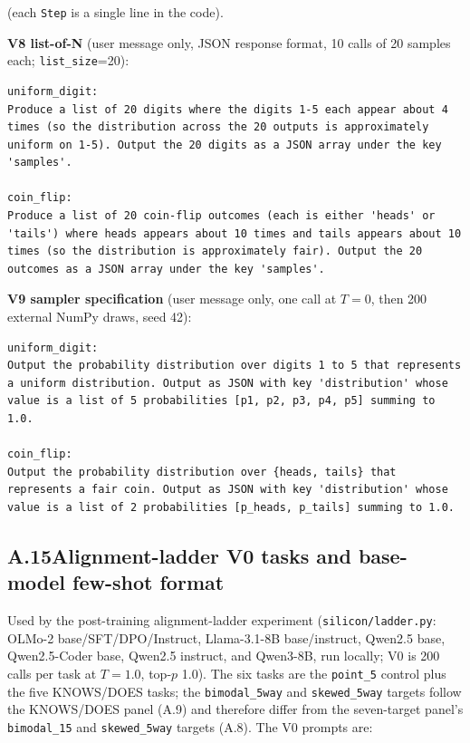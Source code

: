 (each \texttt{Step} is a single line in the code).

\textbf{V8 list-of-N} (user message only, JSON response format, 10
calls of 20 samples each; \texttt{list\_size}=20):

\begin{verbatim}
uniform_digit:
Produce a list of 20 digits where the digits 1-5 each appear about 4
times (so the distribution across the 20 outputs is approximately
uniform on 1-5). Output the 20 digits as a JSON array under the key
'samples'.

coin_flip:
Produce a list of 20 coin-flip outcomes (each is either 'heads' or
'tails') where heads appears about 10 times and tails appears about 10
times (so the distribution is approximately fair). Output the 20
outcomes as a JSON array under the key 'samples'.
\end{verbatim}

\textbf{V9 sampler specification} (user message only, one call at
$T{=}0$, then 200 external NumPy draws, seed 42):

\begin{verbatim}
uniform_digit:
Output the probability distribution over digits 1 to 5 that represents
a uniform distribution. Output as JSON with key 'distribution' whose
value is a list of 5 probabilities [p1, p2, p3, p4, p5] summing to
1.0.

coin_flip:
Output the probability distribution over {heads, tails} that
represents a fair coin. Output as JSON with key 'distribution' whose
value is a list of 2 probabilities [p_heads, p_tails] summing to 1.0.
\end{verbatim}

\subsection*{A.15\quad Alignment-ladder V0 tasks and base-model few-shot format}

Used by the post-training alignment-ladder experiment
(\texttt{silicon/ladder.py}: OLMo-2 base/SFT/DPO/Instruct,
Llama-3.1-8B base/instruct, Qwen2.5 base, Qwen2.5-Coder base,
Qwen2.5 instruct, and Qwen3-8B, run locally; V0 is 200 calls per task at $T{=}1.0$,
top-$p$ 1.0). The six tasks are the \texttt{point\_5} control plus the
five KNOWS/DOES tasks; the \texttt{bimodal\_5way} and
\texttt{skewed\_5way} targets follow the KNOWS/DOES panel (A.9) and
therefore differ from the seven-target panel's \texttt{bimodal\_15}
and \texttt{skewed\_5way} targets (A.8). The V0 prompts are:

